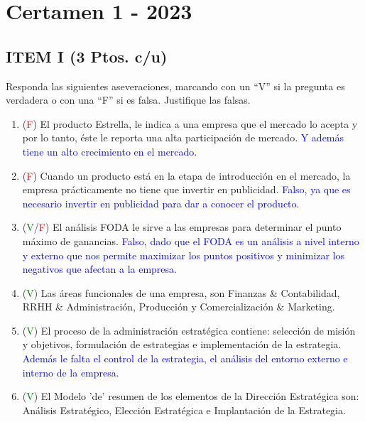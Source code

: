 \documentclass{templateNote}
\begin{document}
\newpage
\section{Certamen 1 - 2023} 

\subsection*{ITEM I (3 Ptos. c/u)}
Responda las siguientes aseveraciones, marcando con un “V” si la pregunta es verdadera o con una “F” si es falsa. Justifique las falsas.   
\begin{enumerate}
    \item (\textcolor{red}{F}) El producto Estrella, le indica a una empresa que el mercado lo acepta y por lo tanto, éste le reporta una alta participación de mercado.\newline
    \textcolor{blue}{
        Y además tiene un alto crecimiento en el mercado.
    }
    \item (\textcolor{red}{F}) Cuando un producto está en la etapa de introducción en el mercado, la empresa prácticamente no tiene que invertir en publicidad.\newline
    \textcolor{blue}{
        Falso, ya que es necesario invertir en publicidad para dar a conocer el producto.
    }
    \item (\textcolor{green}{V}/\textcolor{red}{F}) El análisis FODA le sirve a las empresas para determinar el punto máximo de ganancias.\newline
    \textcolor{blue}{
        Falso, dado que el FODA es un análisis a nivel interno y externo que nos permite maximizar los puntos positivos y minimizar los negativos que afectan a la empresa.
    }
    \item (\textcolor{green}{V}) Las áreas funcionales de una empresa, son Finanzas \& Contabilidad, RRHH \& Administración, Producción y Comercialización \& Marketing.
    \item (\textcolor{green}{V}) El proceso de la administración estratégica contiene: selección de misión y objetivos, formulación de estrategias e implementación de la estrategia.\newline
    \textcolor{blue}{
        Además le falta el control de la estrategia, el análisis del entorno externo e interno de la empresa.
    }
    \item (\textcolor{green}{V}) El Modelo 'de' resumen de los elementos de la Dirección Estratégica son: Análisis Estratégico, Elección Estratégica e Implantación de la Estrategia.

\end{enumerate}
\end{document}
